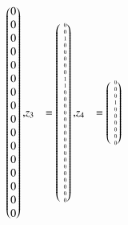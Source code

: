 \begin{beispiel}
\begin{align*}
\begin{pmatrix*}[r]
 0\\
 0\\
 0\\
 0\\
 0\\
 0\\
 0\\
 0\\
 0\\
 0\\
 0\\
 0\\
 0\\
 0\\
 0\\
 0
\end{pmatrix*},
&z_3
&=
\tiny
\begin{pmatrix*}[r]
\phantom{-}
 0\\
 0\\
 1\\
 0\\
 0\\
 0\\
 0\\
 0\\
 1\\
 1\\
 0\\
 0\\
 0\\
 0\\
 0\\
 0\\
 0\\
 0\\
 0\\
 0\\
 0\\
 0\\
 0\\
 0\\
 0\\
 0\\
 0
\end{pmatrix*},
&z_4 %
&=
\tiny
\begin{pmatrix*}[r]
\phantom{-}
 0\\
 0\\
 0\\
 1\\
 0\\
 0\\
 0\\
 0\\
 0\\
 0\\

\end{pmatrix*}
\end{align*}
\end{beispiel}
